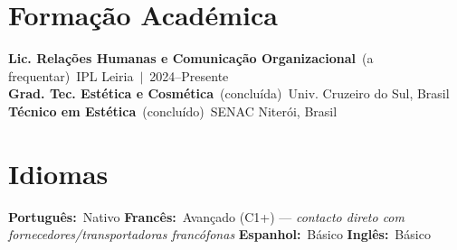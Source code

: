 \documentclass[10pt,a4paper]{article}
\begin{document}
\section{Formação Académica}

{\small\bfseries Lic. Relações Humanas e Comunicação Organizacional}~{\small\color{subtle}(a frequentar)}~\hfill{\small IPL Leiria~$|$~2024--Presente}\\
{\small\bfseries Grad. Tec. Estética e Cosmética}~{\small\color{subtle}(concluída)}~\hfill{\small Univ. Cruzeiro do Sul, Brasil}\\
{\small\bfseries Técnico em Estética}~{\small\color{subtle}(concluído)}~\hfill{\small SENAC Niterói, Brasil}

\section{Idiomas}
{\small
\textbf{Português:}~Nativo\quad
\textbf{Francês:}~Avançado (C1+) --- \textit{contacto direto com fornecedores/transportadoras francófonas}\quad
\textbf{Espanhol:}~Básico\quad
\textbf{Inglês:}~Básico
}
\end{document}
